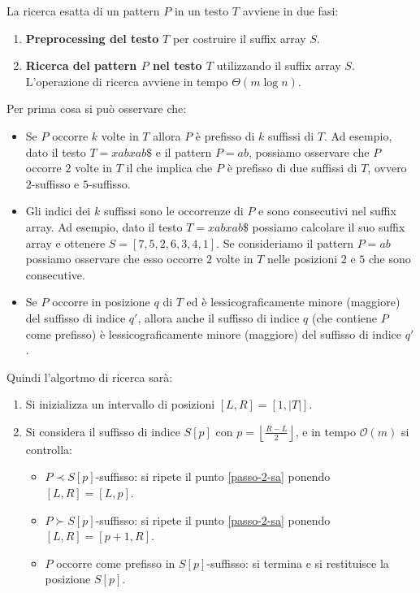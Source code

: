 La ricerca esatta di un pattern $P$ in un testo $T$ avviene in due fasi:
\begin{enumerate}
    \item \textbf{Preprocessing del testo} $T$ per costruire il suffix array $S$.
    \item \textbf{Ricerca del pattern $P$ nel testo $T$} utilizzando il suffix
          array $S$. L'operazione di ricerca avviene in tempo $\Theta(m \log n)$.
\end{enumerate}
Per prima cosa si può osservare che:
\begin{itemize}
    \item Se $P$ occorre $k$ volte in $T$ allora $P$ è prefisso di $k$ suffissi
          di $T$. Ad esempio, dato il testo $T = xabxab\$$ e il pattern $P = ab$,
          possiamo osservare che $P$ occorre $2$ volte in $T$ il che implica che
          $P$ è prefisso di due suffissi di $T$, ovvero $2$-suffisso e
          $5$-suffisso.
    \item Gli indici dei $k$ suffissi sono le occorrenze di $P$ e sono consecutivi
          nel suffix array. Ad esempio, dato il testo $T = xabxab\$$ possiamo
          calcolare il suo suffix array e ottenere $S=[7, 5, 2, 6, 3, 4, 1]$. Se
          consideriamo il pattern $P = ab$ possiamo osservare che  esso occorre
          $2$ volte in $T$ nelle posizioni $2$ e $5$ che sono consecutive.
    \item Se $P$ occorre in posizione $q$ di $T$ ed è lessicograficamente minore
          (maggiore) del suffisso di indice $q'$, allora anche il suffisso di
          indice $q$ (che contiene $P$ come prefisso) è lessicograficamente
          minore (maggiore) del suffisso di indice $q'$.
\end{itemize}
Quindi l'algortmo di ricerca sarà:
\begin{enumerate}
    \item Si inizializza un intervallo di posizioni $[L,R] = [1, |T|]$.
    \item \label{passo-2-sa} Si considera il suffisso di indice $S[p]$ con
          $p = \left\lfloor \frac{R - L}{2} \right\rfloor$, e in tempo
          $\mathcal{O}(m)$ si controlla:
          \begin{itemize}
              \item $P \prec S[p]$-suffisso: si ripete il punto \ref{passo-2-sa}
                    ponendo $[L, R] = [L, p]$.
              \item $P \succ S[p]$-suffisso: si ripete il punto \ref{passo-2-sa}
                    ponendo $[L, R] = [p + 1, R]$.
              \item $P$ occorre come prefisso in $S[p]$-suffisso: si termina e
                    si restituisce la posizione $S[p]$.
          \end{itemize}
\end{enumerate}
